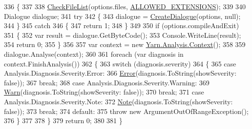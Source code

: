 \begin{DoxyCode}
336         \{
337 
338             \hyperlink{a00189_ad77564b25725a771f0fd4da430582e6f}{CheckFileList}(options.files, \hyperlink{a00189_a0979de7ea02c8c0375b8220a12e6575e}{ALLOWED\_EXTENSIONS});
339 
340             Dialogue dialogue;
341             \textcolor{keywordflow}{try}
342             \{
343                 dialogue = \hyperlink{a00189_aab244361a510cee18ad2f636d110e0d5}{CreateDialogue}(options, null);
344             \}
345             \textcolor{keywordflow}{catch}
346             \{
347                 \textcolor{keywordflow}{return} 1;
348             \}
349 
350             \textcolor{keywordflow}{if} (options.compileAndExit)
351             \{
352                 var result = dialogue.GetByteCode();
353                 Console.WriteLine(result);
354                 \textcolor{keywordflow}{return} 0;
355             \}
356 
357             var context = \textcolor{keyword}{new} \hyperlink{a00051}{Yarn.Analysis.Context}();
358 
359             dialogue.Analyse(context);
360 
361             \textcolor{keywordflow}{foreach} (var diagnosis \textcolor{keywordflow}{in} context.FinishAnalysis())
362             \{
363                 \textcolor{keywordflow}{switch} (diagnosis.severity)
364                 \{
365                     \textcolor{keywordflow}{case} Analysis.Diagnosis.Severity.Error:
366                         \hyperlink{a00189_a2f63f9f5b7634cb50ee75ff2eb18b137}{Error}(diagnosis.ToString(showSeverity: \textcolor{keyword}{false}));
367                         \textcolor{keywordflow}{break};
368                     \textcolor{keywordflow}{case} Analysis.Diagnosis.Severity.Warning:
369                         \hyperlink{a00189_a979bb6f049b6c5294f745a19e24ddd9d}{Warn}(diagnosis.ToString(showSeverity: \textcolor{keyword}{false}));
370                         \textcolor{keywordflow}{break};
371                     \textcolor{keywordflow}{case} Analysis.Diagnosis.Severity.Note:
372                         \hyperlink{a00189_a939cc9e943c574b36c6af93e9c772702}{Note}(diagnosis.ToString(showSeverity: \textcolor{keyword}{false}));
373                         \textcolor{keywordflow}{break};
374                     \textcolor{keywordflow}{default}:
375                         \textcolor{keywordflow}{throw} \textcolor{keyword}{new} ArgumentOutOfRangeException();
376                 \}
377 
378             \}
379             \textcolor{keywordflow}{return} 0;
380 
381         \}
\end{DoxyCode}


